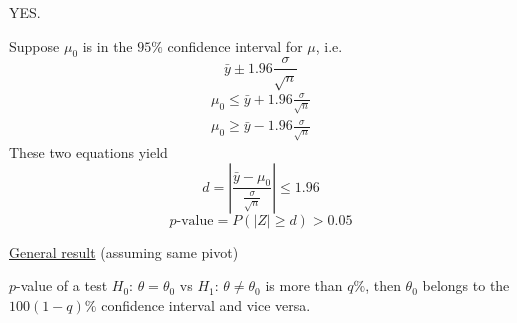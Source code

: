 YES.

Suppose $ \mu_0 $ is in the $ 95\% $ confidence interval for $ \mu $, i.e.
\[ \bar{y}\pm 1.96 \frac{\sigma}{\sqrt{n}} \]
\[ \begin{aligned}
        \mu_0\leqslant \bar{y}+1.96 \frac{\sigma}{\sqrt{n}} \\
        \mu_0\geqslant \bar{y}-1.96 \frac{\sigma}{\sqrt{n}}
    \end{aligned}
\]
These two equations yield
\[ d=\left|\frac{\bar{y}-\mu_0}{\frac{\sigma}{\sqrt{n}}} \right|\leqslant 1.96 \]
\[ p\text{-value}=P(|Z|\geqslant d)>0.05 \]

\underline{General result} (assuming same pivot)

$ p $-value of a test $ H_0 $: $ \theta=\theta_0 $ vs $ H_1 $: $ \theta\neq \theta_0 $
is more than $ q\% $, then $ \theta_0 $ belongs to the $ 100(1-q)\% $
confidence interval and vice versa.

